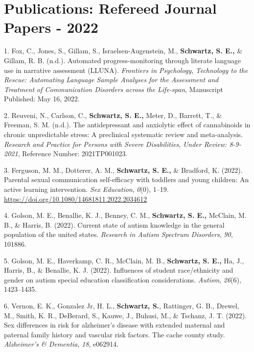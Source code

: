 \documentclass[11pt,a4paper,]{moderncv}
\newlength{\cslhangindent}
\newenvironment{CSLReferences}[2] %
 {\begin{list}{}{%
  \setlength{\itemindent}{0pt}
  \setlength{\leftmargin}{0pt}
  \setlength{\parsep}{0pt}
  \ifodd #1
   \setlength{\leftmargin}{\cslhangindent}
   \setlength{\itemindent}{-1\cslhangindent}
  \fi
  \setlength{\itemsep}{#2\baselineskip}}}
 {\end{list}}
\begin{document}
\endgroup

\vspace{7mm}

\section{Publications: Refereed Journal Papers -
2022}\label{publications-refereed-journal-papers---2022}

\begingroup
\setlength{\parindent}{-0.5in}
\setlength{\leftskip}{0.5in}

\label{refs-11ac5ee3431fbe8d29075eba9defc8cc}
\begin{CSLReferences}{1}{0}
1. Fox, C., Jones, S., Gillam, S., Israelsen-Augenstein, M.,
\textbf{Schwartz, S. E.,} \& Gillam, R. B. (n.d.). Automated
progress-monitoring through literate language use in narrative
assessment (LLUNA). \emph{Frontiers in Psychology}, \emph{Technology to
the Rescue: Automating Language Sample Analyses for the Assessment and
Treatment of Communication Disorders across the Life-span}, Manuscript
Published: May 16, 2022.

2. Reuveni, N., Carlson, C., \textbf{Schwartz, S. E.,} Meter, D.,
Barrett, T., \& Freeman, S. M. (n.d.). The antidepressant and anxiolytic
effect of cannabinoids in chronic unpredictable stress: A preclinical
systematic review and meta-analysis. \emph{Research and Practice for
Persons with Severe Disabilities}, \emph{Under Review: 8-9-2021},
Reference Number: 2021TP001023.

3. Ferguson, M. M., Dotterer, A. M., \textbf{Schwartz, S. E.,} \&
Bradford, K. (2022). Parental sexual communication self-efficacy with
toddlers and young children: An active learning intervention. \emph{Sex
Education}, \emph{0}(0), 1--19.
\url{https://doi.org/10.1080/14681811.2022.2034612}

4. Golson, M. E., Benallie, K. J., Benney, C. M.,
\textbf{Schwartz, S. E.,} McClain, M. B., \& Harris, B. (2022). Current
state of autism knowledge in the general population of the united
states. \emph{Research in Autism Spectrum Disorders}, \emph{90}, 101886.

5. Golson, M. E., Haverkamp, C. R., McClain, M. B.,
\textbf{Schwartz, S. E.,} Ha, J., Harris, B., \& Benallie, K. J. (2022).
Influences of student race/ethnicity and gender on autism special
education classification considerations. \emph{Autism}, \emph{26}(6),
1423--1435.

6. Vernon, E. K., Gonzalez Jr, H. L., \textbf{Schwartz, S.}, Rattinger,
G. B., Drewel, M., Smith, K. R., DeBerard, S., Kauwe, J., Buhusi, M., \&
Tschanz, J. T. (2022). Sex differences in risk for alzheimer's disease
with extended maternal and paternal family history and vascular risk
factors. The cache county study. \emph{Alzheimer's \& Dementia},
\emph{18}, e062914.

\end{CSLReferences}
\end{document}
